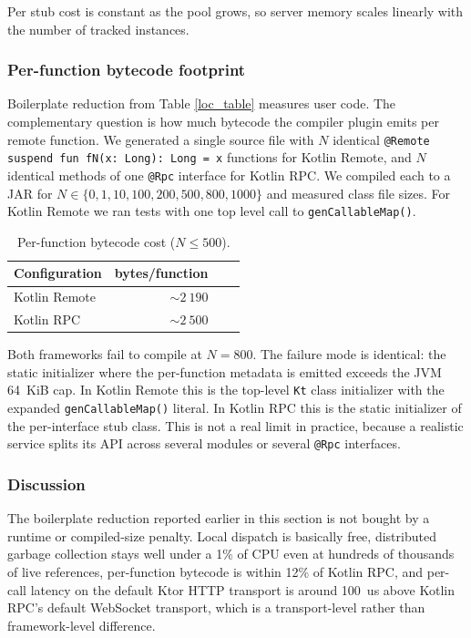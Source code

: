 \documentclass[a4paper,11pt,oneside]{article}
\newcommand{\kotlini}[1]{\texttt{#1}}
\newcommand{\ki}[1]{\kotlini{#1}}
\begin{document}
Per stub cost is constant as the pool grows, so server memory scales linearly with the
number of tracked instances.

\subsubsection{Per-function bytecode footprint}\label{growth_study_section}

Boilerplate reduction from Table \ref{loc_table} measures user code. The complementary
question is how much bytecode the compiler plugin emits per remote function. We
generated a single source file with $N$ identical
\kotlini{@Remote suspend fun fN(x: Long): Long = x} functions for Kotlin Remote, and $N$
identical methods of one \kotlini{@Rpc} interface for Kotlin RPC. We compiled each to a
JAR for $N \in \{0, 1, 10, 100, 200, 500, 800, 1000\}$ and measured class file sizes.
For Kotlin Remote we ran tests with one top level call to \ki{genCallableMap()}.

\begin{table}[!h]
	\begin{center}
		\begin{tabular}{lrrr}
			\toprule
			Configuration & bytes/function \\
			\midrule
			Kotlin Remote & ${\sim}2~190$  \\
			Kotlin RPC    & ${\sim}2~500$  \\
			\bottomrule
		\end{tabular}
		\caption{Per-function bytecode cost
			($N \le 500$).}\label{growth_table}
	\end{center}
\end{table}

Both frameworks fail to compile at $N = 800$. The failure mode is identical: the static
initializer where the per-function metadata is emitted exceeds the JVM 64~KiB cap. In
Kotlin Remote this is the top-level \texttt{Kt} class initializer with the expanded
\kotlini{genCallableMap()} literal. In Kotlin RPC this is the static initializer of the
per-interface stub class. This is not a real limit in practice, because a realistic service splits
its API across several modules or several \kotlini{@Rpc} interfaces.

\subsubsection{Discussion}

The boilerplate reduction reported earlier in this section is not bought by a runtime
or compiled-size penalty. Local dispatch is basically free, distributed garbage
collection stays well under a 1\% of CPU even at hundreds of thousands of live
references, per-function bytecode is within 12\% of Kotlin RPC, and per-call
latency on the default Ktor HTTP transport is around 100~us above Kotlin RPC's default
WebSocket transport, which is a transport-level rather than framework-level difference.
\end{document}
